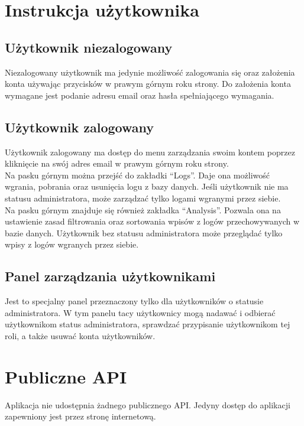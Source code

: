 \documentclass[12pt,a4paper]{article}
\begin{document}
    \section{Instrukcja użytkownika}
        \subsection{Użytkownik niezalogowany}
            Niezalogowany użytkownik ma jedynie możliwość zalogowania się oraz założenia konta używając przycisków w prawym górnym roku strony.
            Do założenia konta wymagane jest podanie adresu email oraz hasła spełniającego wymagania.
        \subsection{Użytkownik zalogowany}
            Użytkownik zalogowany ma dostęp do menu zarządzania swoim kontem poprzez kliknięcie na swój adres email w prawym górnym roku strony.\\
            Na pasku górnym można przejść do zakładki ``Logs''.
            Daje ona możliwość wgrania, pobrania oraz usunięcia logu z bazy danych.
            Jeśli użytkownik nie ma statusu administratora, może zarządzać tylko logami wgranymi przez siebie.\\
            Na pasku górnym znajduje się również zakładka ``Analysis''.
            Pozwala ona na ustawienie zasad filtrowania oraz sortowania wpisów z logów przechowywanych w bazie danych.
            Użytkownik bez statusu administratora może przeglądać tylko wpisy z logów wgranych przez siebie.
        \subsection{Panel zarządzania użytkownikami}
            Jest to specjalny panel przeznaczony tylko dla użytkowników o statusie administratora.
            W tym panelu tacy użytkownicy mogą nadawać i odbierać użytkownikom status administratora, sprawdzać przypisanie użytkownikom tej roli, a także usuwać konta użytkowników.
    \section{Publiczne API}
        Aplikacja nie udostępnia żadnego publicznego API.
        Jedyny dostęp do aplikacji zapewniony jest przez stronę internetową.
\end{document}
